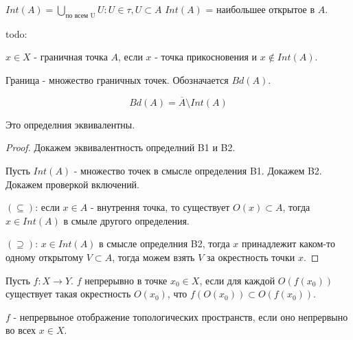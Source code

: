 \begin{definition}[B2]
    $Int(A) = \bigcup_{\text{по всем U}} U : U \in \tau, U \subset A$
    $Int(A)$ = наибольшее открытое в $A$.
\end{definition}


todo: 
\begin{definition}
    $x \in X$ - граничная точка $A$, если $x$ - точка прикосновения и $x \notin Int(A)$.  

    Граница - множество граничных точек.
    Обозначается $Bd(A)$.
\end{definition}

\begin{nota_bene}
    \[
        Bd(A) = \overline{A} \setminus Int(A)
    \]
\end{nota_bene}

\begin{theorem}
    Это определния эквивалентны.
\end{theorem}
\begin{proof}
    Докажем эквивалентность определний B1 и B2.

    Пусть $Int(A)$ - множество точек в смысле определения B1. Докажем B2.
    Докажем проверкой включений.

    $(\subseteq)$: если $x \in A$ - внутрення точка, то существует $O(x) \subset A$, тогда $x \in Int(A)$ в смыле другого определения.

    $(\supseteq)$: $x \in Int(A)$ в смысле определния B2, тогда $x$ принадлежит каком-то одному открытому $V \subset A$, тогда можем взять $V$ за окрестность точки $x$.
\end{proof}

\begin{definition}
    Пусть $f: X \rightarrow Y$. $f$ непрерывно в точке $x_0 \in X$, если для каждой $O(f(x_0))$ существует такая окрестность $O(x_0)$, что $f(O(x_0)) \subset O(f(x_0))$. 

    $f$ - непрервыное отображение топологических пространств, если оно непрервыно во всех $x \in X$.
\end{definition}

